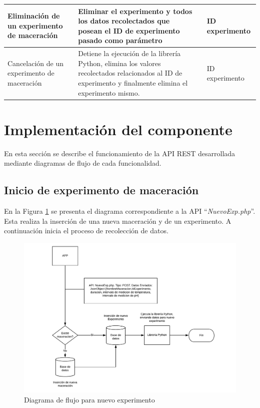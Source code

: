 \begin{longtable}{|p{2.2cm}|p{4.8cm}|p{3.5cm}|p{3.5cm}|}
            Eliminación de un experimento de maceración & Eliminar el experimento y todos los datos recolectados que posean el ID de experimento pasado como parámetro &  & ID experimento\\
            \hline
                    
            Cancelación de un experimento de maceración & Detiene la ejecución de la librería Python, elimina los valores recolectados relacionados al ID de experimento y finalmente elimina el experimento mismo. & & ID experimento\\
            \hline
            
\end{longtable}     
  
    \section{Implementación del componente}
        \par En esta sección se describe el funcionamiento de la API REST desarrollada mediante diagramas de flujo de cada funcionalidad.
        
        \subsection{Inicio de experimento de maceración}
        \par En la Figura \ref{fig:ApiNuevoExp} se presenta el diagrama correspondiente a la API ``\textit{NuevoExp.php}''. Esta realiza la inserción de una nueva maceración y de un experimento. A continuación inicia el proceso de recolección de datos.
            \begin{figure} [h]
                \centering
                \includegraphics[scale=0.58]{Interfaz_Hard-Soft/DiagramaNuevoExp.pdf}
                \caption{Diagrama de flujo para nuevo experimento}
                \label{fig:ApiNuevoExp}
            \end{figure}
            
